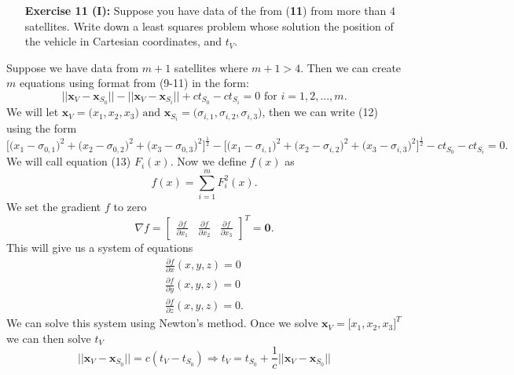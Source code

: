 \documentclass[11pt]{article}
\theoremstyle{definition}
\newcommand{\1}[1]{\mathbf{1} \left \{ #1 \right \}}
\begin{document}
\begin{itemize}
\item[{\textbf{Exercise 11 (I):}}] Suppose you have data of the from (\textbf{11}) from more than $4$ satellites.  Write down a least squares problem whose solution the position of the vehicle in Cartesian coordinates, and $t_V$.
\end{itemize}
Suppose we have data from $m+1$ satellites where $m+1>4$.  Then we can create $m$ equations using format from (9-11) in the form:
\begin{equation}
    ||\textbf{x}_V - \textbf{x}_{S_0}|| - ||\textbf{x}_V - \textbf{x}_{S_i}|| + ct_{S_0} - ct_{S_i} = 0 \text{ for } i = 1,2,...,m.
\end{equation}
We will let \(\textbf{x}_V = \big(x_1, x_2, x_3\big) \text{ and } \textbf{x}_{S_i} = \big(\sigma_{i,1}, \sigma_{i,2}, \sigma_{i,3}\big)\), then we can write (12) using the form
\begin{equation}
    \Big[\big(x_1 - \sigma_{0,1}\big)^2 + \big(x_2 - \sigma_{0,2}\big)^2 + \big(x_3 - \sigma_{0,3}\big)^2\Big]^{\frac{1}{2}} - \Big[\big(x_1 - \sigma_{i,1}\big)^2 + \big(x_2 - \sigma_{i,2}\big)^2 + \big(x_3 - \sigma_{i,3}\big)^2\Big]^{\frac{1}{2}} - ct_{S_0} - ct_{S_i} = 0.
\end{equation}
We will call equation (13) $F_i (x)$.  Now we define $f(x)$ as
\begin{equation}
    f(x) = \sum_{i=1}^m F_i^2 (x).
\end{equation}
We set the gradient $f$ to zero \[\nabla f = \begin{bmatrix}
\frac{\partial f}{\partial x_1} & \frac{\partial f}{\partial x_2} & \frac{\partial f}{\partial x_3}
\end{bmatrix}^T = \textbf{0}.\]
This will give us a system of equations
\begin{align*}
    \frac{\partial f}{\partial x}(x,y,z) = 0 \\
    \frac{\partial f}{\partial y}(x,y,z) = 0 \\
    \frac{\partial f}{\partial z}(x,y,z) = 0.
\end{align*}
We can solve this system using Newton's method.  Once we solve \(\textbf{x}_V = \big[x_1, x_2, x_3\big]^T\) we can then solve $t_V$
\[\big|\big|\textbf{x}_V - \textbf{x}_{S_0}\big|\big| = c(t_V - t_{S_0}) \Rightarrow t_V = t_{S_0} + \frac{1}{c}\bigg|\bigg|\textbf{x}_V - \textbf{x}_{S_0}\bigg|\bigg|\]
\end{document}
